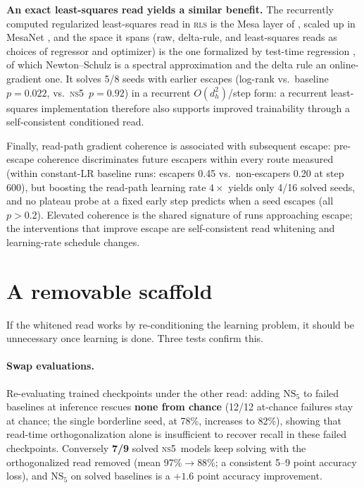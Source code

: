 \documentclass[11pt]{article}
\newcommand{\ns}{\textsc{ns5}}
\begin{document}
\textbf{An exact least-squares read yields a similar benefit.} The recurrently
computed regularized least-squares read in \textsc{rls} is the
Mesa layer of \citet{vonoswald2023mesa}, scaled up in MesaNet
\citep{vonoswald2025mesanet}, and the space it spans (raw, delta-rule, and
least-squares reads as choices of regressor and optimizer) is the one
formalized by test-time regression \citep{wang2025testtime}, of which
Newton--Schulz is a spectral approximation and the delta rule an
online-gradient one. It solves 5/8 seeds with earlier escapes (log-rank
vs.\ baseline $p=0.022$, vs.\ \ns\ $p=0.92$) in a recurrent $O(d_h^2)$/step
form: a recurrent least-squares implementation therefore also supports improved
trainability through a self-consistent conditioned read.

Finally, read-path gradient coherence is associated with subsequent escape:
pre-escape coherence discriminates future escapers within every route measured
(within constant-LR baseline runs: escapers 0.45 vs.\ non-escapers 0.20 at step
600), but boosting the read-path learning rate
$4\times$ yields only 4/16 solved seeds, and no plateau probe at a fixed early step predicts
when a seed escapes (all $p>0.2$). Elevated coherence is the shared
signature of runs approaching escape; the interventions that improve escape
are self-consistent read whitening and learning-rate schedule changes.

\section{A removable scaffold}
\label{sec:scaffold}

If the whitened read works by re-conditioning the learning problem, it should be
unnecessary once learning is done. Three tests confirm this.

\paragraph{Swap evaluations.} Re-evaluating trained checkpoints under the other
read: adding $\mathrm{NS}_5$ to failed baselines at inference rescues
\textbf{none from chance} (12/12 at-chance failures stay at chance; the single
borderline seed, at 78\%, increases to 82\%), showing that read-time orthogonalization
alone is insufficient to recover
recall in these failed checkpoints. Conversely \textbf{7/9} solved \ns\ models keep solving with the
orthogonalized read removed (mean 97\%$\to$88\%; a consistent 5--9 point accuracy loss), and
$\mathrm{NS}_5$ on solved baselines is a $+1.6$ point accuracy improvement.
\end{document}
